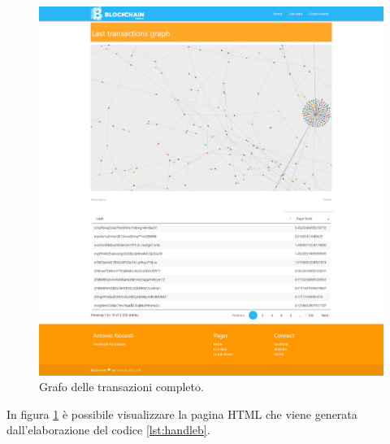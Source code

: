 \begin{itemize}

\begin{figure}[H]
	\centering
	\includegraphics[width=\textwidth, height=0.80\textheight]{images/graphView.png}
	\caption{Grafo delle transazioni completo.}
	\label{fig:graphView}
\end{figure}
In figura \ref{fig:graphView} è possibile visualizzare la pagina HTML che viene generata dall'elaborazione del codice \ref{lst:handleb}. 

\end{itemize}